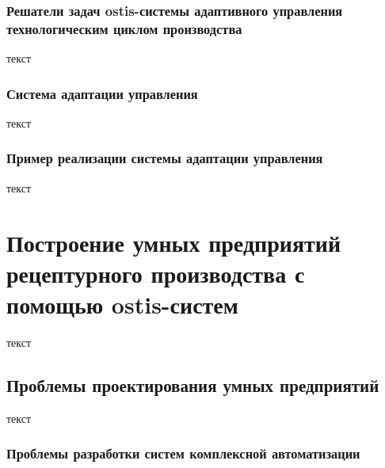 \subsubsection{Решатели задач ostis-системы адаптивного управления технологическим циклом производства}

текст

\subsubsection{Система адаптации управления}

текст

\subsubsection{Пример реализации системы адаптации управления}

текст

\section{Построение умных предприятий рецептурного производства с помощью ostis-систем}

текст

\subsection{Проблемы проектирования умных предприятий}

текст

\subsubsection{Проблемы разработки систем комплексной автоматизации}

